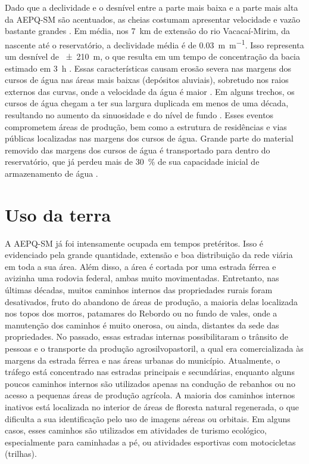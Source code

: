 Dado que a declividade e o desnível entre a parte mais baixa e a parte mais alta da AEPQ-SM são 
acentuados, as cheias costumam apresentar velocidade e vazão bastante grandes \cite{PaivaEtAl2001, 
SutiliEtAl2009}. Em média, nos \SI{7}{\kilo\metre} de extensão do rio Vacacaí-Mirim, da nascente até
o reservatório, a declividade média é de \SI{0,03}{\metre\per\metre}. Isso representa um desnível de
\SI{\pm210}{\metre}, o que resulta em um tempo de concentração da bacia estimado em \SI{3}{\hour} 
\cite{PaivaEtAl2001}. Essas características causam erosão severa nas margens dos cursos de água nas
áreas mais baixas (depósitos aluviais), sobretudo nos raios externos das curvas, onde a velocidade 
da água é maior \cite{SutiliEtAl2009}. Em alguns trechos, os cursos de água chegam a ter sua 
largura duplicada em menos de uma década, resultando no aumento da sinuosidade e do nível de fundo 
\cite{PaivaEtAl2001}. Esses eventos comprometem áreas de produção, bem como a estrutura de 
residências e vias públicas localizadas nas margens dos cursos de água. Grande parte do material 
removido das margens dos cursos de água é transportado para dentro do reservatório, que já perdeu 
mais de \SI{30}{\percent} de sua capacidade inicial de armazenamento de água \cite{DillEtAl2004}.

\tocless\section{Uso da terra}

A AEPQ-SM já foi intensamente ocupada em tempos pretéritos. Isso é evidenciado pela grande 
quantidade, extensão e boa distribuição da rede viária em toda a sua área. Além disso, a área é 
cortada por uma estrada férrea e avizinha uma rodovia federal, ambas muito movimentadas. Entretanto,
nas últimas décadas, muitos caminhos internos das propriedades rurais foram desativados, fruto do 
abandono de áreas de produção, a maioria delas localizada nos topos dos morros, patamares do Rebordo
ou no fundo de vales, onde a manutenção dos caminhos é muito onerosa, ou ainda, distantes da sede 
das propriedades. No passado, essas estradas internas possibilitaram o trânsito de pessoas e o 
transporte da produção agrosilvopastoril, a qual era comercializada às margens da estrada férrea e 
nas áreas urbanas do município. Atualmente, o tráfego está concentrado nas estradas principais e 
secundárias, enquanto alguns poucos caminhos internos são utilizados apenas na condução de rebanhos 
ou no acesso a pequenas áreas de produção agrícola. A maioria dos caminhos internos inativos está 
localizada no interior de áreas de floresta natural regenerada, o que dificulta a sua identificação 
pelo uso de imagens aéreas ou orbitais. Em alguns casos, esses caminhos são utilizados em atividades
de turismo ecológico, especialmente para caminhadas a pé, ou atividades esportivas com motocicletas
(trilhas).

